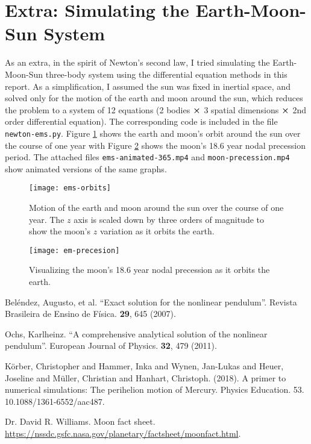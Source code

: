 \documentclass[11pt, a4paper]{article}
\begin{document}
\section{Extra: Simulating the Earth-Moon-Sun System}
As an extra, in the spirit of Newton's second law, I tried simulating the Earth-Moon-Sun three-body system using the differential equation methods in this report. As a simplification, I assumed the sun was fixed in inertial space, and solved only for the motion of the earth and moon around the sun, which reduces the problem to a system of 12 equations (2 bodies $ \cross $ 3 spatial dimensions $ \cross $ 2nd order differential equation). The corresponding code is included in the file \texttt{newton-ems.py}. Figure \ref{newton:fig:ems} shows the earth and moon's orbit around the sun over the course of one year with Figure \ref{newton:fig:moon} shows the moon's 18.6 year nodal precession period. The attached files \texttt{ems-animated-365.mp4} and \texttt{moon-precession.mp4} show animated versions of the same graphs.

\begin{figure}[htb!]
\texttt{[image: ems-orbits]}
\caption{Motion of the earth and moon around the sun over the course of one year. The $ z $ axis is scaled down by three orders of magnitude to show the moon's $ z $ variation as it orbits the earth.}
\label{newton:fig:ems}
\end{figure}

\begin{figure}[htb!]
\texttt{[image: em-precesion]}
\caption{Visualizing the moon's 18.6 year nodal precession as it orbits the earth.}
\label{newton:fig:moon}
\end{figure}



\begin{thebibliography}{}
\setlength{\itemsep}{.2\itemsep}\setlength{\parsep}{.5\parsep}

 Bel\'{e}ndez, Augusto, et al. ``Exact solution for the nonlinear pendulum''. Revista Brasileira de Ensino de Física. \textbf{29}, 645 (2007).

 Ochs, Karlheinz. ``A comprehensive analytical solution of the nonlinear pendulum''. European Journal of Physics. \textbf{32}, 479 (2011). 


Körber, Christopher and Hammer, Inka and Wynen, Jan-Lukas and Heuer, Joseline and Müller, Christian and Hanhart, Christoph. (2018). A primer to numerical simulations: The perihelion motion of Mercury. Physics Education. 53. 10.1088/1361-6552/aac487.



Dr. David R. Williams. Moon fact sheet. \url{https://nssdc.gsfc.nasa.gov/planetary/factsheet/moonfact.html}.



\end{thebibliography}
\end{document}
